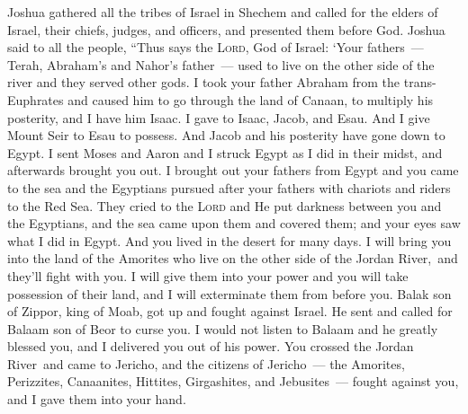 
\begin{inparaenum}
     Joshua gathered all the tribes of Israel in Shechem and called for the elders of Israel, their chiefs, judges, and officers, and presented them before God.%
     Joshua said to all the people, ``Thus says the \textsc{Lord}, God of Israel: `Your fathers~--- Terah, Abraham's and Nahor's father~--- used to live on the other side of the river and they served other gods.%
     I took your father Abraham from the trans-Euphrates and caused him to go through the land of Canaan, to multiply his posterity, and I have him Isaac.%
     I gave to Isaac, Jacob, and Esau. And I give Mount Seir to Esau to possess. And Jacob and his posterity have gone down to Egypt.%
     I sent Moses and Aaron and I struck Egypt as I did in their midst, and afterwards brought you out.%
     I brought out your fathers from Egypt and you came to the sea and the Egyptians pursued after your fathers with chariots and riders to the Red Sea.%
     They cried to the \textsc{Lord} and He put darkness between you and the Egyptians, and the sea came upon them and covered them; and your eyes saw what I did in Egypt. And you lived in the desert for many days.%
     I will bring you into the land of the Amorites who live on the other side of the Jordan River,\understood\ and they'll fight with you. I will give them into your power and you will take possession of their land, and I will exterminate them from before you.%
     Balak son of Zippor, king of Moab, got up and fought against Israel. He sent and called for Balaam son of Beor to curse you.%
     I would not listen to Balaam and he greatly blessed you, and I delivered you out of his power.%
     You crossed the Jordan River\understood\ and came to Jericho, and the citizens of Jericho~--- the Amorites, Perizzites, Canaanites, Hittites, Girgashites, and Jebusites~--- fought against you, and I gave them into your hand.%

\end{inparaenum}
